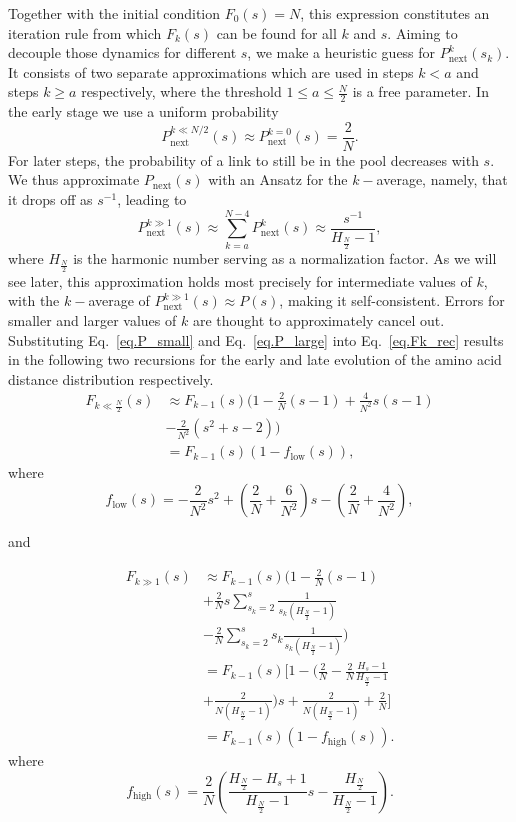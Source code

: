 \documentclass[
reprint,
twocolumn,
amsmath,amssymb,superscriptaddress,aps,
pre]{revtex4-1}
\newcommand{\Pin}{P_{\mathrm{next}}}
\newcommand{\fhigh}{f_{\mathrm{high}}}
\newcommand{\flow}{f_{\mathrm{low}}}
\begin{document}
Together with the initial condition $F_0(s)=N$, this expression constitutes an iteration rule from which $F_k(s)$ can be found for all $k$ and $s$. Aiming to decouple those dynamics for different $s$, we make a heuristic guess for $\Pin^k(s_k)$. It consists of two separate approximations which are used in steps $k<a$ and steps $k\geq a$ respectively, where the threshold $1\leq a\leq \frac{N}{2}$ is a free parameter. In the early stage we use a uniform probability
\begin{equation}
    \Pin^{k\ll N/2}(s)\approx \Pin^{k=0}(s)=\frac{2}{N}.
    \label{eq.P_small}
\end{equation}
For later steps, the probability of a link to still be in the pool decreases with $s$. We thus approximate $\Pin(s)$ with an Ansatz for the $k-$average, namely, that it drops off as $s^{-1}$, leading to
\begin{equation}
    \Pin^{k\gg 1}(s)\approx \sum_{k=a}^{N-4}\Pin^{k}(s)
    \approx \frac{s^{-1}}{ H_{\frac{N}{2}}-1},
    \label{eq.P_large}
\end{equation}
where $H_{\frac{N}{2}}$ is the harmonic number serving as a normalization factor. 
As we will see later, this approximation holds most precisely for intermediate values of $k$, with the $k-$average of $\Pin^{k\gg 1}(s)\approx P(s)$, making it self-consistent. Errors for smaller and larger values of $k$ are thought to approximately cancel out.
Substituting Eq.~\ref{eq.P_small} and Eq.~\ref{eq.P_large} into Eq.~\ref{eq.Fk_rec} results in the following two recursions for the early and late evolution of the amino acid distance distribution respectively.
\begin{align}
   F_{k\ll \frac{N}{2}}(s)&\approx 
   F_{k-1}(s)\Big(1-\frac{2}{N} (s-1) 
   +\frac{4}{N^2} s (s-1)\nonumber \\
   &-\frac{2}{N^2}(s^2+s-2)\Big)\nonumber \\
   &=F_{k-1}(s)(1-\flow(s)),
   \label{eq.Fk_rec_low}
\end{align}
where 
\[\flow(s)=-\frac{2}{N^2}s^2+\left(\frac{2}{N}+\frac{6}{N^2}\right)s-\left(\frac{2}{N}+\frac{4}{N^2}\right),\]

and

\begin{align}
   F_{k\gg1}(s)&\approx F_{k-1}(s)\Big(1-\frac{2}{N} (s-1) \nonumber\\
   &+\frac{2}{N} s \sum_{s_k=2}^{s}\frac{1}{s_k(H_{\frac{N}{2}}-1)}\nonumber\\
   &-\frac{2}{N} \sum_{s_k=2}^{s} s_k \frac{1}{s_k(H_{\frac{N}{2}}-1)}\Big)\nonumber \\
   &=F_{k-1}(s)\bigg[1 -\Big(\frac{2}{N}-\frac{2}{N}\frac{H_{s}-1}{H_{\frac{N}{2}}-1} \nonumber\\
   &+\frac{2}{N(H_{\frac{N}{2}}-1)}\Big)s \nonumber + \frac{2}{N(H_{\frac{N}{2}}-1)} + \frac{2}{N}\bigg]\nonumber \\
   &=F_{k-1}(s)(1-\fhigh(s)).
   \label{eq.Fk_rec_high}
\end{align}
where 
\[\fhigh(s)=\frac{2}{N}\left(\frac{H_{\frac{N}{2}}-H_{s}+1}{H_{\frac{N}{2}}-1}s-\frac{H_{\frac{N}{2}}}{H_{\frac{N}{2}}-1}\right).\]
\end{document}

